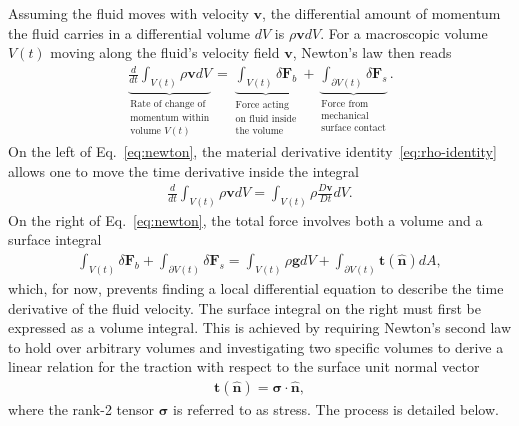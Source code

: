 Assuming the fluid moves with velocity $\bm{v}$, the differential amount of momentum the fluid carries in a differential volume $dV$ is $\rho\bm{v}dV$. For a macroscopic volume $V(t)$ moving along the fluid's velocity field $\bm{v}$, Newton's law then reads
\begin{align}\label{eq:newton}
    \underbrace{\frac{d}{dt}\int_{V(t)}\rho\bm{v}dV}_{\substack{\text{Rate of change of}\\\text{momentum within}\\\text{volume $V(t)$}}} = \underbrace{\int_{V(t)}\delta\bm{F}_b}_{\substack{\text{Force acting}\\\text{on fluid inside}\\\text{the volume}}} + \underbrace{\int_{\partial V(t)}\delta\bm{F}_s}_{\substack{\text{Force from}\\\text{mechanical}\\\text{surface contact}}}.
\end{align}
On the left of Eq.~\eqref{eq:newton}, the material derivative identity~\eqref{eq:rho-identity} allows one to move the time derivative inside the integral
\begin{align}
    \frac{d}{dt}\int_{V(t)}\rho\bm{v}dV = \int_{V(t)}\rho\frac{D\bm{v}}{Dt}dV.
\end{align}
On the right of Eq.~\eqref{eq:newton}, the total force involves both a volume and a surface integral
\begin{align}
    \int_{V(t)}\delta \bm{F}_b+\int_{\partial V(t)}\delta\bm{F}_s=\int_{V(t)}\rho\bm{g}dV+\int_{\partial V(t)}\bm{t}(\bm{\hat{n}})dA,
\end{align}
which, for now, prevents finding a local differential equation to describe the time derivative of the fluid velocity. The surface integral on the right must first be expressed as a volume integral. This is achieved by requiring Newton's second law to hold over arbitrary volumes and investigating two specific volumes to derive a linear relation for the traction with respect to the surface unit normal vector
\begin{align}
    \bm{t}(\bm{\hat{n}})=\bm{\sigma}\cdot\bm{\hat{n}},
\end{align} 
where the rank-2 tensor $\bm{\sigma}$ is referred to as stress. The process is detailed below.
